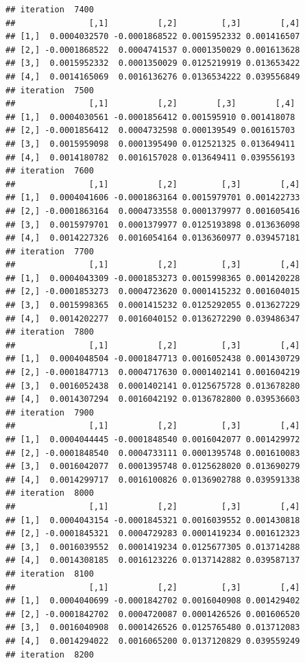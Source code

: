 \documentclass[
]{article}
\begin{document}
\begin{verbatim}
## iteration  7400 
##               [,1]          [,2]         [,3]        [,4]
## [1,]  0.0004032570 -0.0001868522 0.0015952332 0.001416507
## [2,] -0.0001868522  0.0004741537 0.0001350029 0.001613628
## [3,]  0.0015952332  0.0001350029 0.0125219919 0.013653422
## [4,]  0.0014165069  0.0016136276 0.0136534222 0.039556849
## iteration  7500 
##               [,1]          [,2]        [,3]        [,4]
## [1,]  0.0004030561 -0.0001856412 0.001595910 0.001418078
## [2,] -0.0001856412  0.0004732598 0.000139549 0.001615703
## [3,]  0.0015959098  0.0001395490 0.012521325 0.013649411
## [4,]  0.0014180782  0.0016157028 0.013649411 0.039556193
## iteration  7600 
##               [,1]          [,2]         [,3]        [,4]
## [1,]  0.0004041606 -0.0001863164 0.0015979701 0.001422733
## [2,] -0.0001863164  0.0004733558 0.0001379977 0.001605416
## [3,]  0.0015979701  0.0001379977 0.0125193898 0.013636098
## [4,]  0.0014227326  0.0016054164 0.0136360977 0.039457181
## iteration  7700 
##               [,1]          [,2]         [,3]        [,4]
## [1,]  0.0004043309 -0.0001853273 0.0015998365 0.001420228
## [2,] -0.0001853273  0.0004723620 0.0001415232 0.001604015
## [3,]  0.0015998365  0.0001415232 0.0125292055 0.013627229
## [4,]  0.0014202277  0.0016040152 0.0136272290 0.039486347
## iteration  7800 
##               [,1]          [,2]         [,3]        [,4]
## [1,]  0.0004048504 -0.0001847713 0.0016052438 0.001430729
## [2,] -0.0001847713  0.0004717630 0.0001402141 0.001604219
## [3,]  0.0016052438  0.0001402141 0.0125675728 0.013678280
## [4,]  0.0014307294  0.0016042192 0.0136782800 0.039536603
## iteration  7900 
##               [,1]          [,2]         [,3]        [,4]
## [1,]  0.0004044445 -0.0001848540 0.0016042077 0.001429972
## [2,] -0.0001848540  0.0004733111 0.0001395748 0.001610083
## [3,]  0.0016042077  0.0001395748 0.0125628020 0.013690279
## [4,]  0.0014299717  0.0016100826 0.0136902788 0.039591338
## iteration  8000 
##               [,1]          [,2]         [,3]        [,4]
## [1,]  0.0004043154 -0.0001845321 0.0016039552 0.001430818
## [2,] -0.0001845321  0.0004729283 0.0001419234 0.001612323
## [3,]  0.0016039552  0.0001419234 0.0125677305 0.013714288
## [4,]  0.0014308185  0.0016123226 0.0137142882 0.039587137
## iteration  8100 
##               [,1]          [,2]         [,3]        [,4]
## [1,]  0.0004040699 -0.0001842702 0.0016040908 0.001429402
## [2,] -0.0001842702  0.0004720087 0.0001426526 0.001606520
## [3,]  0.0016040908  0.0001426526 0.0125765480 0.013712083
## [4,]  0.0014294022  0.0016065200 0.0137120829 0.039559249
## iteration  8200 

\end{verbatim}
\end{document}
